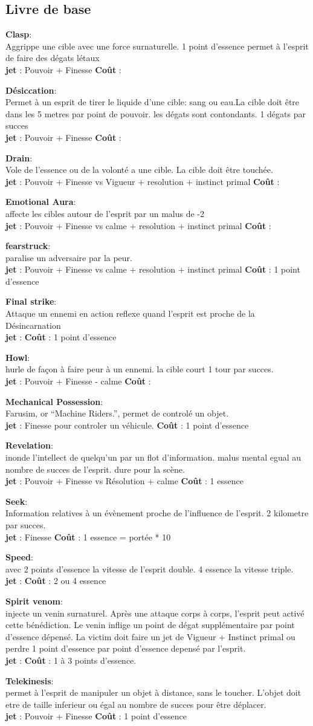 \documentclass[oneside,12pt]{book}
\newcommand\bless[4]{
\textbf{#1}: \\
#2 \\
\textbf{jet} : #3
\textbf{Coût} : #4 \\
\vspace{0.5cm}
}
\begin{document}
\begin{flushleft}
\section{Livre de base}
\bless{Clasp}{Aggrippe une cible avec une force surnaturelle. 1 point d'essence permet à l'esprit de faire des dégats létaux}{Pouvoir + Finesse}{}
\bless{Désiccation}{Permet à un esprit de tirer le liquide d'une cible: sang ou eau.La cible doit être dans les 5 metres par point de pouvoir. les dégats sont contondants. 1 dégats par succes}{Pouvoir + Finesse}{}
\bless{Drain}{Vole de l'essence ou de la volonté a une cible. La cible doit être touchée.}{Pouvoir + Finesse vs Vigueur + resolution + instinct primal}{}
\bless{Emotional Aura}{affecte les cibles autour de l'esprit par un malus de -2}{Pouvoir + Finesse vs calme + resolution + instinct primal}{}
\bless{fearstruck}{paralise un adversaire par la peur.}{Pouvoir + Finesse vs calme + resolution + instinct primal}{1 point d'essence}
\bless{Final strike}{Attaque un ennemi en action reflexe quand l'esprit est proche de la Désincarnation}{}{1 point d'essence}
\bless{Howl}{hurle de façon à faire peur à un ennemi. la cible court 1 tour par succes.}{Pouvoir + Finesse - calme}{}
\bless{Mechanical Possession}{Farusim, or “Machine Riders.”, permet de controlé un objet.}{ Finesse pour controler un véhicule.}{1 point d'essence}
\bless{Revelation}{inonde l'intellect de quelqu'un par un flot d'information. malus mental egual au nombre de succes de l'esprit. dure pour la scène. }{Pouvoir + Finesse vs Résolution + calme}{1 essence}
\bless{Seek}{Information relatives à un évènement proche de l'influence de l'esprit. 2 kilometre par succes.}{Finesse}{1 essence = portée * 10}
\bless{Speed}{avec 2 points d'essence la vitesse de l'esprit double. 4 essence la vitesse triple. }{}{2 ou 4 essence}
\bless{Spirit venom}{injecte un venin surnaturel. Après une attaque corps à corps, l'esprit peut activé cette bénédiction. Le venin inflige un point de dégat supplémentaire par point d'essence dépensé. La victim doit faire un jet de Vigueur + Instinct primal ou perdre 1 point d'essence par point d'essence depensé par l'esprit.   }{}{ 1 à 3 points d'essence.}
\bless{Telekinesis}{permet à l'esprit de manipuler un objet à distance, sans le toucher. L'objet doit etre de taille inferieur ou égal au nombre de succes pour être déplacer.}{Pouvoir + Finesse}{1 point d'essence}

\end{flushleft}
\end{document}
